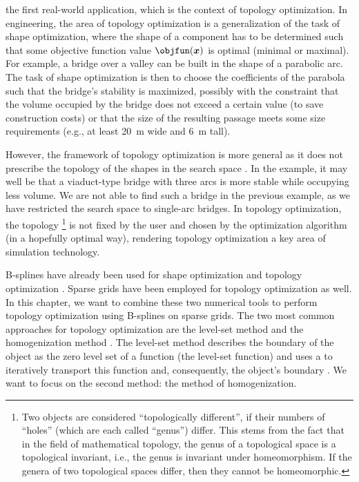
\label{chap:60topoOpt}

the first real-world application,
which is the context of topology optimization.
In engineering,
the area of topology optimization is a generalization of the
task of shape optimization, where the shape of a component has to be
determined such that some objective function value $\objfun(\*x)$ is optimal
(minimal or maximal).
For example, a bridge over a valley can be built in the shape of a
parabolic arc.
The task of shape optimization is then to choose the coefficients of the
parabola such that the bridge's stability is maximized,
possibly with the constraint that the volume occupied by the bridge
does not exceed a certain value (to save construction costs) or
that the size of the resulting passage meets some size requirements
(e.g., at least \SI{20}{\meter} wide and \SI{6}{\meter} tall).

However, the framework of topology optimization is more general as
it does not prescribe the topology
of the shapes in the search space \cite{Allaire16Towards}.
In the example, it may well be that a viaduct-type bridge with three arcs
is more stable while occupying less volume.
We are not able to find such a bridge in the previous example,
as we have restricted the search space to single-arc bridges.
In topology optimization, the topology%
\footnote{%
  Two objects are considered ``topologically different'',
  if their numbers of ``holes'' (which are each called ``genus'') differ.
  This stems from the fact that in the field of mathematical topology,
  the genus of a topological space is a topological invariant, i.e.,
  the genus is invariant under homeomorphism.
  If the genera of two topological spaces differ, then they cannot be
  homeomorphic.%
}
is not fixed by the user
and chosen by the optimization algorithm (in a hopefully optimal way),
rendering topology optimization a key area of simulation technology.

B-splines have already been used for
shape optimization \cite{Martin16Formoptimierung} and
topology optimization .
Sparse grids have been employed for
topology optimization \cite{Huebner14Mehrdimensionale} as well.
In this chapter, we want to combine these two numerical tools
to perform topology optimization using B-splines on sparse grids.
The two most common approaches for topology optimization are
the level-set method and the homogenization method \cite{Allaire16Towards}.
The level-set method describes the boundary of the object
as the zero level set of a function (the level-set function)
and uses a \pde to iteratively transport this function and,
consequently, the object's boundary \cite{Allaire04Topology}.
We want to focus on the second method: the method of homogenization.

